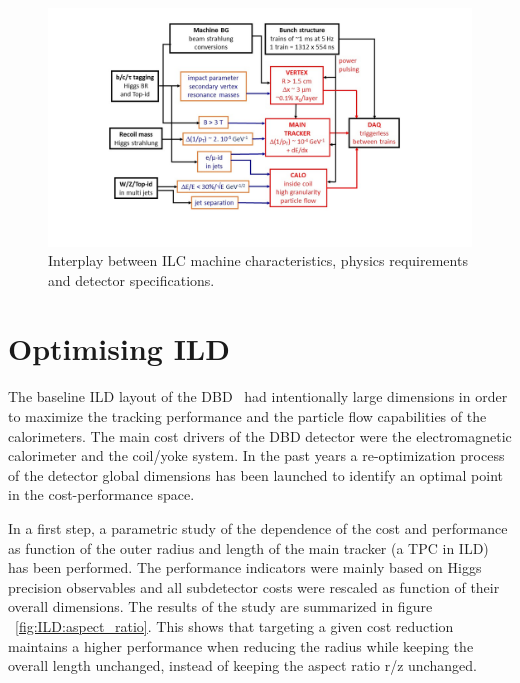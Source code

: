 \begin{figure}[t!]
\centering
\includegraphics[width=1.0\hsize]{ILD/fig/ILD_specifications.jpg}
\caption{Interplay between ILC machine characteristics, physics requirements and detector specifications.}
\label{fig:ILD:specifications}
\end{figure}


\section{Optimising ILD}

The baseline ILD layout of the DBD~\cite{ild:bib:ILDDBD} had intentionally large dimensions in order to maximize the tracking performance and the particle flow capabilities of the calorimeters. The main cost drivers of the DBD detector were the electromagnetic calorimeter and the coil/yoke system. In the past years a re-optimization process of the detector global dimensions has been launched to identify an optimal point in the cost-performance space.

In a first step, a parametric study of the dependence of the cost and performance as function of the outer radius and length of the main tracker (a TPC in ILD) has been performed. The performance indicators were mainly based on Higgs precision observables and all subdetector costs were rescaled as function of their overall dimensions. The results of the study are summarized in figure ~\ref{fig:ILD:aspect_ratio}. This shows that targeting a given cost reduction maintains a higher performance when reducing the radius while keeping the overall length unchanged, instead of keeping the aspect ratio r/z unchanged.  

